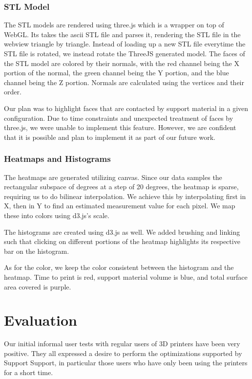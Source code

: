 \documentclass{sigchi}
\begin{document}
\subsubsection{STL Model}
The STL models are rendered using three.js which is a wrapper on top of WebGL. Its takes the ascii STL file and parses it, rendering the STL file in the webview triangle by triangle. Instead of loading up a new STL file everytime the STL file is rotated, we instead rotate the ThreeJS generated model.  The faces of the STL model are colored by their normals, with the red channel being the X portion of the normal, the green channel being the Y portion, and the blue channel being the Z portion.  Normals are calculated using the vertices and their order.

Our plan was to highlight faces that are contacted by support material in a given configuration.  Due to time constraints and unexpected treatment of faces by three.js, we were unable to implement this feature.  However, we are confident that it is possible and plan to implement it as part of our future work.

\subsubsection{Heatmaps and Histograms}
The heatmaps are generated utilizing canvas. Since our data samples the rectangular subspace of degrees at a step of 20 degrees, the heatmap is sparse, requiring us to do bilinear interpolation. We achieve this by interpolating first in X, then in Y to find an estimated measurement value for each pixel.  We map these into colors using d3.js's scale.

The histograms are created using d3.js as well. We added brushing and linking such that clicking on different portions of the heatmap highlights its respective bar on the histogram.

As for the color, we keep the color consistent between the histogram and the heatmap. Time to print is red, support material volume is blue, and total surface area covered is purple.

\section{Evaluation}
Our initial informal user tests with regular users of 3D printers have been very positive.  They all expressed a desire to perform the optimizations supported by Support Support, in particular those users who have only been using the printers for a short time.
\end{document}
